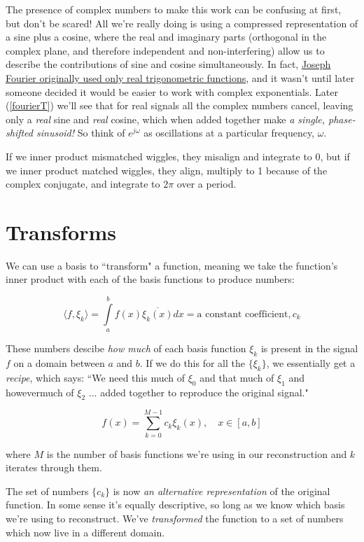 \documentclass[10pt]{article}
\begin{document}
The presence of complex numbers to make this work can be confusing at first, but don't be scared! All we're really doing is using a compressed representation of a sine plus a cosine, where the real and imaginary parts (orthogonal in the complex plane, and therefore independent and non-interfering) allow us to describe the contributions of sine and cosine simultaneously. In fact, \href{https://math.stackexchange.com/a/1293127/278341}{Joseph Fourier originally used only real trigonometric functions}\cite{complex}, and it wasn't until later someone decided it would be easier to work with complex exponentials. Later (\autoref{fourierT}) we'll see that for real signals all the complex numbers cancel, leaving only a \textit{real} sine and \textit{real} cosine, which when added together make \textit{a single, phase-shifted sinusoid!} So think of $e^{j \omega}$ as oscillations at a particular frequency, $\omega$.

If we inner product mismatched wiggles, they misalign and integrate to 0, but if we inner product matched wiggles, they align, multiply to 1 because of the complex conjugate, and integrate to $2\pi$ over a period.

\section{Transforms}

We can use a basis to ``transform" a function, meaning we take the function's inner product with each of the basis functions to produce numbers:

$$ \langle f,\xi_k \rangle = \int\limits_{a}^{b} f(x) \overline{\xi_k(x)} dx = \text{a constant coefficient}, c_k $$

These numbers descibe \textit{how much} of each basis function $\xi_k$ is present in the signal $f$ on a domain between $a$ and $b$. If we do this for all the $\{\xi_k\}$, we essentially get a \textit{recipe}, which says: ``We need this much of $\xi_0$ and that much of $\xi_1$ and howevermuch of $\xi_2$ ... added together to reproduce the original signal."

$$ f(x) = \sum_{k=0}^{M-1} c_k \xi_k(x), \quad x \in [a, b] $$

where $M$ is the number of basis functions we're using in our reconstruction and $k$ iterates through them.\newline

The set of numbers $\{c_k\}$ is now \textit{an alternative representation} of the original function. In some sense it's equally descriptive, so long as we know which basis we're using to reconstruct. We've \textit{transformed} the function to a set of numbers which now live in a different domain.
\end{document}

